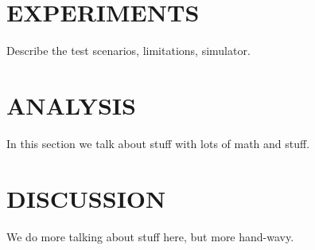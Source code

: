 \documentclass[a4paper, 10pt, conference]{ieeeconf}      %
\begin{document}
\section{EXPERIMENTS}
Describe the test scenarios, limitations, simulator.

\section{ANALYSIS}
In this section we talk about stuff with lots of math and stuff.  

\section{DISCUSSION}
We do more talking about stuff here, but more hand-wavy.



% 
% 
% 
% 
\end{document}
